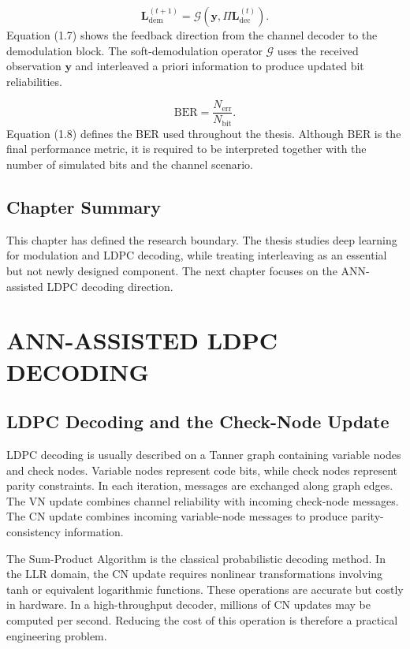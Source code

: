 \begin{equation}
\mathbf{L}^{(t+1)}_{\mathrm{dem}}=
\mathcal{G}\!\left(\mathbf{y},\Pi\mathbf{L}^{(t)}_{\mathrm{dec}}\right).
\end{equation}
Equation (1.7) shows the feedback direction from the channel decoder to the demodulation block. The soft-demodulation operator $\mathcal{G}$ uses the received observation $\mathbf{y}$ and interleaved a priori information to produce updated bit reliabilities.

\begin{equation}
\mathrm{BER}=\frac{N_{\mathrm{err}}}{N_{\mathrm{bit}}}.
\end{equation}
Equation (1.8) defines the BER used throughout the thesis. Although BER is the final performance metric, it is required to be interpreted together with the number of simulated bits and the channel scenario.

\section{Chapter Summary}
This chapter has defined the research boundary. The thesis studies deep learning for modulation and LDPC decoding, while treating interleaving as an essential but not newly designed component. The next chapter focuses on the ANN-assisted LDPC decoding direction.

\chapter[\textbf{ANN-ASSISTED LDPC DECODING}]{ANN-ASSISTED LDPC DECODING}
\section{LDPC Decoding and the Check-Node Update}
LDPC decoding is usually described on a Tanner graph containing variable nodes and check nodes. Variable nodes represent code bits, while check nodes represent parity constraints. In each iteration, messages are exchanged along graph edges. The VN update combines channel reliability with incoming check-node messages. The CN update combines incoming variable-node messages to produce parity-consistency information.

The Sum-Product Algorithm is the classical probabilistic decoding method. In the LLR domain, the CN update requires nonlinear transformations involving tanh or equivalent logarithmic functions. These operations are accurate but costly in hardware. In a high-throughput decoder, millions of CN updates may be computed per second. Reducing the cost of this operation is therefore a practical engineering problem.

